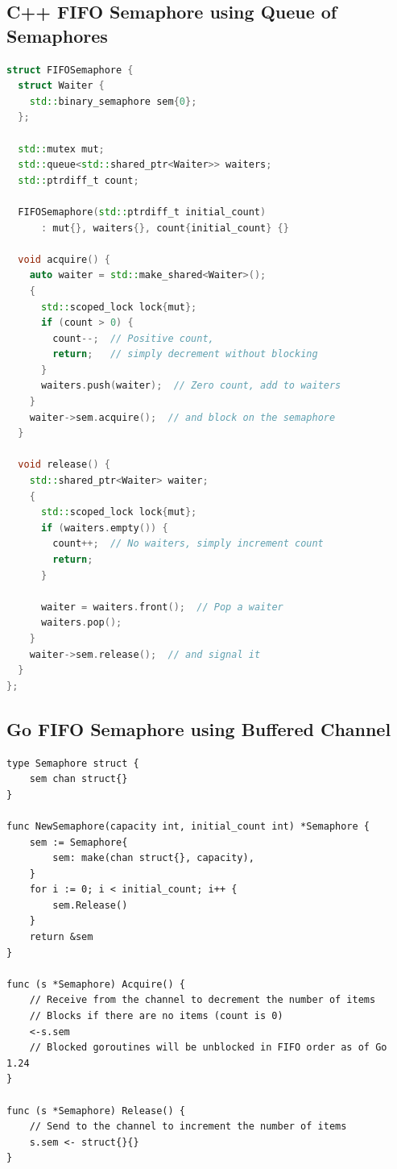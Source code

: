 \documentclass{article}
\begin{document}
\subsection{C++ FIFO Semaphore using Queue of Semaphores}
\begin{lstlisting}[language=C++]
struct FIFOSemaphore {
  struct Waiter {
    std::binary_semaphore sem{0};
  };

  std::mutex mut;
  std::queue<std::shared_ptr<Waiter>> waiters;
  std::ptrdiff_t count;

  FIFOSemaphore(std::ptrdiff_t initial_count)
      : mut{}, waiters{}, count{initial_count} {}

  void acquire() {
    auto waiter = std::make_shared<Waiter>();
    {
      std::scoped_lock lock{mut};
      if (count > 0) {
        count--;  // Positive count,
        return;   // simply decrement without blocking
      }
      waiters.push(waiter);  // Zero count, add to waiters
    }
    waiter->sem.acquire();  // and block on the semaphore
  }

  void release() {
    std::shared_ptr<Waiter> waiter;
    {
      std::scoped_lock lock{mut};
      if (waiters.empty()) {
        count++;  // No waiters, simply increment count
        return;
      }

      waiter = waiters.front();  // Pop a waiter
      waiters.pop();
    }
    waiter->sem.release();  // and signal it
  }
};
\end{lstlisting}

\subsection{Go FIFO Semaphore using Buffered Channel}
\begin{lstlisting}[language=Golang]
type Semaphore struct {
	sem chan struct{}
}

func NewSemaphore(capacity int, initial_count int) *Semaphore {
	sem := Semaphore{
		sem: make(chan struct{}, capacity),
	}
	for i := 0; i < initial_count; i++ {
		sem.Release()
	}
	return &sem
}

func (s *Semaphore) Acquire() {
	// Receive from the channel to decrement the number of items
	// Blocks if there are no items (count is 0)
	<-s.sem
	// Blocked goroutines will be unblocked in FIFO order as of Go 1.24
}

func (s *Semaphore) Release() {
	// Send to the channel to increment the number of items
	s.sem <- struct{}{}
}
\end{lstlisting}
\end{document}
